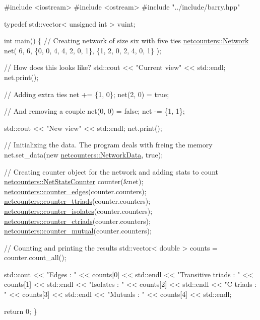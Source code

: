 \begin{DoxyCode}
\textcolor{preprocessor}{#include <iostream>}
\textcolor{preprocessor}{#include <ostream>}
\textcolor{preprocessor}{#include "../include/barry.hpp"}

\textcolor{keyword}{typedef} std::vector< unsigned int > vuint;

\textcolor{keywordtype}{int} main() \{
  \textcolor{comment}{// Creating network of size six with five ties}
  \hyperlink{classbarry_1_1_b_array}{netcounters::Network} net(
      6, 6,
      \{0, 0, 4, 4, 2, 0, 1\},
      \{1, 2, 0, 2, 4, 0, 1\}
  );

  \textcolor{comment}{// How does this looks like?}
  std::cout << \textcolor{stringliteral}{"Current view"} << std::endl;
  net.print();

  \textcolor{comment}{// Adding extra ties}
  net += \{1, 0\};
  net(2, 0) = \textcolor{keyword}{true};

  \textcolor{comment}{// And removing a couple}
  net(0, 0) = \textcolor{keyword}{false};
  net -= \{1, 1\};

  std::cout << \textcolor{stringliteral}{"New view"} << std::endl;  
  net.print();

  \textcolor{comment}{// Initializing the data. The program deals with freing the memory}
  net.set\_data(\textcolor{keyword}{new} \hyperlink{classbarry_1_1counters_1_1network_1_1_network_data}{netcounters::NetworkData}, \textcolor{keyword}{true});

  \textcolor{comment}{// Creating counter object for the network and adding stats to count}
  \hyperlink{classbarry_1_1_stats_counter}{netcounters::NetStatsCounter} counter(&net);
  \hyperlink{network_8hpp_ad99a1aea236ff51c04fef9adc2c109d6}{netcounters::counter\_edges}(counter.counters);
  \hyperlink{network_8hpp_a043549f6d9ef81413b15ca87247dfb2e}{netcounters::counter\_ttriads}(counter.counters);
  \hyperlink{network_8hpp_aba4b5f1b19373c13ad98c560472e3a50}{netcounters::counter\_isolates}(counter.counters);
  \hyperlink{network_8hpp_a76e9747c3e1205de253863aaf28f669e}{netcounters::counter\_ctriads}(counter.counters);
  \hyperlink{network_8hpp_a00c2d4285f8b49f4abbb07dc8fd11267}{netcounters::counter\_mutual}(counter.counters);

  \textcolor{comment}{// Counting and printing the results}
  std::vector< double > counts = counter.count\_all();

  std::cout <<
    \textcolor{stringliteral}{"Edges             : "} << counts[0] << std::endl <<
    \textcolor{stringliteral}{"Transitive triads : "} << counts[1] << std::endl <<
    \textcolor{stringliteral}{"Isolates          : "} << counts[2] << std::endl <<
    \textcolor{stringliteral}{"C triads          : "} << counts[3] << std::endl <<
    \textcolor{stringliteral}{"Mutuals           : "} << counts[4] << std::endl;

  \textcolor{keywordflow}{return} 0;
\}
\end{DoxyCode}


